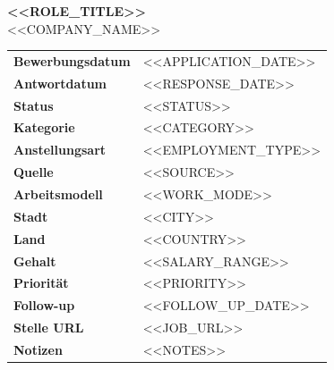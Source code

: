 \documentclass[a4paper,11pt]{scrartcl}
\begin{document}
\begin{center}
{\LARGE\textbf{<<ROLE_TITLE>>}}\\[0.5em]
{\large <<COMPANY_NAME>>}
\end{center}

\vspace{1.5em}

\begin{tabular}{lp{10cm}}
\textbf{Bewerbungsdatum}  & <<APPLICATION_DATE>> \\[0.3em]
\textbf{Antwortdatum}     & <<RESPONSE_DATE>> \\[0.3em]
\textbf{Status}           & <<STATUS>> \\[0.3em]
\textbf{Kategorie}        & <<CATEGORY>> \\[0.3em]
\textbf{Anstellungsart}   & <<EMPLOYMENT_TYPE>> \\[0.3em]
\textbf{Quelle}           & <<SOURCE>> \\[0.3em]
\textbf{Arbeitsmodell}    & <<WORK_MODE>> \\[0.3em]
\textbf{Stadt}            & <<CITY>> \\[0.3em]
\textbf{Land}             & <<COUNTRY>> \\[0.3em]
\textbf{Gehalt}           & <<SALARY_RANGE>> \\[0.3em]
\textbf{Priorit\"at}      & <<PRIORITY>> \\[0.3em]
\textbf{Follow-up}        & <<FOLLOW_UP_DATE>> \\[0.3em]
\textbf{Stelle URL}       & <<JOB_URL>> \\[0.3em]
\textbf{Notizen}          & <<NOTES>> \\
\end{tabular}
\end{document}
